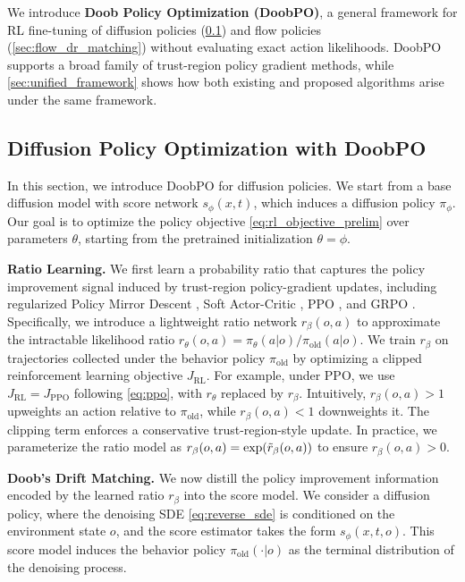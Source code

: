 
We introduce \textbf{Doob Policy Optimization (DoobPO)}, a general framework for RL fine-tuning of diffusion policies (\cref{sec:diff_dr_matching}) and flow policies (\cref{sec:flow_dr_matching}) without evaluating exact action likelihoods.
DoobPO supports a broad family of trust-region policy gradient methods, while \cref{sec:unified_framework} shows how both existing and proposed algorithms arise under the same framework.

\subsection{Diffusion Policy Optimization with DoobPO}
\label{sec:diff_dr_matching}

In this section, we introduce DoobPO for diffusion policies.
We start from a base diffusion model with score network $s_\phi(x,t)$, which induces a diffusion policy $\pi_\phi$.
Our goal is to optimize the policy objective \eqref{eq:rl_objective_prelim} over parameters $\theta$, starting from the pretrained initialization $\theta=\phi$.

\textbf{Ratio Learning.}
We first learn a probability ratio that captures the policy improvement signal induced by trust-region policy-gradient updates, including regularized Policy Mirror Descent \cite{zhan2023policy}, Soft Actor-Critic \cite{haarnoja2018soft}, PPO \cite{schulman2017proximal}, and GRPO \cite{shao2024deepseekmath}.
Specifically, we introduce a lightweight ratio network $r_\beta(o,a)$ to approximate the intractable likelihood ratio
$r_\theta(o,a)=\pi_\theta(a|o)/\pi_{\mathrm{old}}(a|o)$.
We train $r_\beta$ on trajectories collected under the behavior policy $\pi_{\mathrm{old}}$ by optimizing a clipped reinforcement learning objective $J_{\mathrm{RL}}$.
For example, under PPO, we use
$J_{\mathrm{RL}} = J_{\mathrm{PPO}}$
following \eqref{eq:ppo}, with $r_\theta$ replaced by $r_\beta$.
Intuitively, $r_\beta(o,a)>1$ upweights an action relative to $\pi_{\mathrm{old}}$, while $r_\beta(o,a)<1$ downweights it.
The clipping term enforces a conservative trust-region-style update.
In practice, we parameterize the ratio model as
$r_\beta(o,a)=\exp(\Tilde{r}_\beta(o,a))$ to ensure $r_\beta(o,a)>0$.


\textbf{Doob's Drift Matching.}
We now distill the policy improvement information encoded by the learned ratio $r_\beta$ into the score model.
We consider a diffusion policy, where the denoising SDE \eqref{eq:reverse_sde} is conditioned on the environment state $o$, and the score estimator takes the form $s_\phi(x,t,o)$.
This score model induces the behavior policy $\pi_{\mathrm{old}}(\cdot|o)$ as the terminal distribution of the denoising process.

